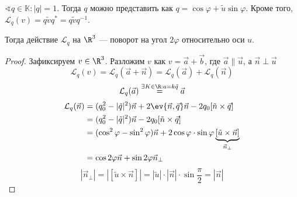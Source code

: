 \begin{theorem}
	\(\sphericalangle q \in \mathbb{K} : |q| = 1\). Тогда \(q\) можно представить как  \(q = \cos\varphi + \tilde{u}\sin\varphi\). Кроме того, \(\mathcal{L}_q(v) = q \tilde{v} q^* = q \tilde{v} q^{-1}\).

	Тогда действие \(\mathcal{L}_q\) на \(\R^3\) --- поворот на угол  \(2 \varphi\) относительно оси  \(u\).
\end{theorem}
\begin{proof}
	Зафиксируем \(v \in \R^3\). Разложим \(v\) как \(v = \vec{a} + \vec{b}\),
	где \(\vec{a} \parallel \vec{u}\), а \(\vec{n} \perp \vec{u}\)
	\[\mathcal{L}_q(v) = \mathcal{L}_q(\vec{a} + \vec{n})
		= \mathcal{L}_q(\vec{a}) + \mathcal{L}_q(\vec{n})\]
    \[\mathcal{L}_q(\vec{a}) \stackrel{\exists K \in \R : a = k \tilde{q}}{=} \vec{a}\] 
    \begin{align*}
        \mathcal{L}_q(\vec{n})
         &= (q_0^2 - |\tilde{q}|^2)\vec{n} + 2 \ev{\vec{n}, \vec{q}} \vec{n} - 2 q_0 [\tilde{n} \times \vec{q}] \\
         &= (q_0^2 - |\tilde{q}|^2)\vec{n} - 2q_0[\tilde{n} \times \vec{q}] \\
         &= (\cos^2 \varphi - \sin^2 \varphi) \vec{n} + 2 \cos\varphi \cdot \sin\varphi \underbrace{[\tilde{u} \times \vec{n}]}_{\vec{n}_\perp} \\
         &= \cos 2\varphi \vec{n} + \sin 2\varphi \vec{n}_\perp
    \end{align*}
    \[|\vec{n}_\perp| = |[\tilde{u} \times \vec{n}]| = |\tilde{u}| \cdot |\vec{n}| \cdot \sin \frac{\pi}{2} = |\vec{n}|\] 
\end{proof}

\unfinished

